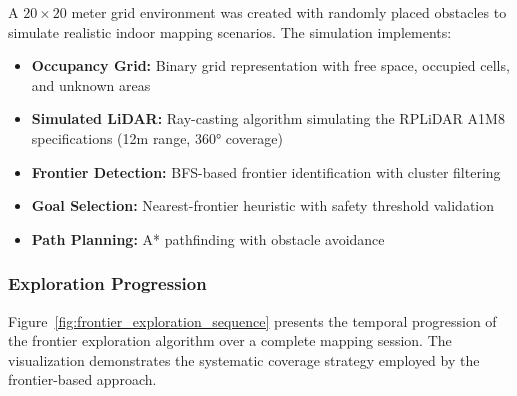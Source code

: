 A $20 \times 20$ meter grid environment was created with randomly placed obstacles to simulate realistic indoor mapping scenarios. The simulation implements:

\begin{itemize}
    \item \textbf{Occupancy Grid:} Binary grid representation with free space, occupied cells, and unknown areas
    \item \textbf{Simulated LiDAR:} Ray-casting algorithm simulating the RPLiDAR A1M8 specifications (12m range, 360° coverage)
    \item \textbf{Frontier Detection:} BFS-based frontier identification with cluster filtering
    \item \textbf{Goal Selection:} Nearest-frontier heuristic with safety threshold validation
    \item \textbf{Path Planning:} A* pathfinding with obstacle avoidance
\end{itemize}

\subsubsection{Exploration Progression}

Figure~\ref{fig:frontier_exploration_sequence} presents the temporal progression of the frontier exploration algorithm over a complete mapping session. The visualization demonstrates the systematic coverage strategy employed by the frontier-based approach.

